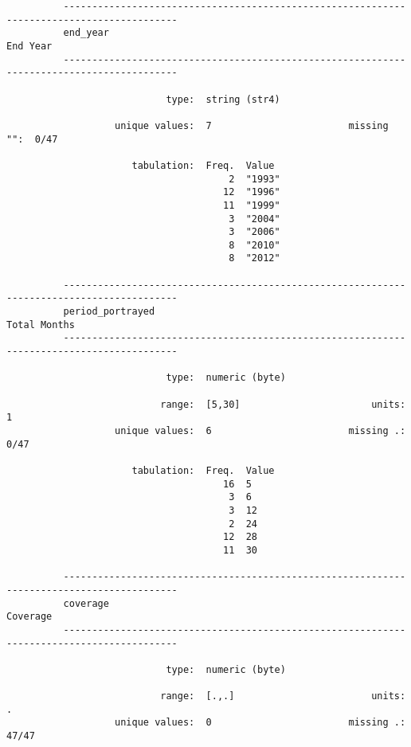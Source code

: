 \documentclass{article}
\begin{document}
\begin{verbatim}
          ------------------------------------------------------------------------------------------
          end_year                                                                          End Year
          ------------------------------------------------------------------------------------------
          
                            type:  string (str4)
          
                   unique values:  7                        missing "":  0/47
          
                      tabulation:  Freq.  Value
                                       2  "1993"
                                      12  "1996"
                                      11  "1999"
                                       3  "2004"
                                       3  "2006"
                                       8  "2010"
                                       8  "2012"
          
          ------------------------------------------------------------------------------------------
          period_portrayed                                                              Total Months
          ------------------------------------------------------------------------------------------
          
                            type:  numeric (byte)
          
                           range:  [5,30]                       units:  1
                   unique values:  6                        missing .:  0/47
          
                      tabulation:  Freq.  Value
                                      16  5
                                       3  6
                                       3  12
                                       2  24
                                      12  28
                                      11  30
          
          ------------------------------------------------------------------------------------------
          coverage                                                                          Coverage
          ------------------------------------------------------------------------------------------
          
                            type:  numeric (byte)
          
                           range:  [.,.]                        units:  .
                   unique values:  0                        missing .:  47/47
          

\end{verbatim}
\end{document}
